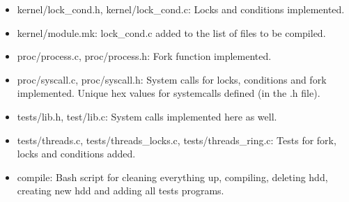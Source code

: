 \documentclass[11pt,a4paper]{article}
\begin{document}
\begin{itemize}
\item kernel/lock\_cond.h, kernel/lock\_cond.c: Locks and conditions
implemented.
\item kernel/module.mk: lock\_cond.c added to the list of files to be compiled.
\item proc/process.c, proc/process.h: Fork function implemented.
\item proc/syscall.c, proc/syscall.h: System calls for locks, conditions and
fork implemented. Unique hex values for systemcalls defined (in the .h file).
\item tests/lib.h, test/lib.c: System calls implemented here as well.
\item tests/threads.c, tests/threads\_locks.c, tests/threads\_ring.c: Tests for
fork, locks and conditions added.
\item compile: Bash script for cleaning everything up, compiling, deleting hdd,
creating new hdd and adding all tests programs.
\end{itemize}
\end{document}
